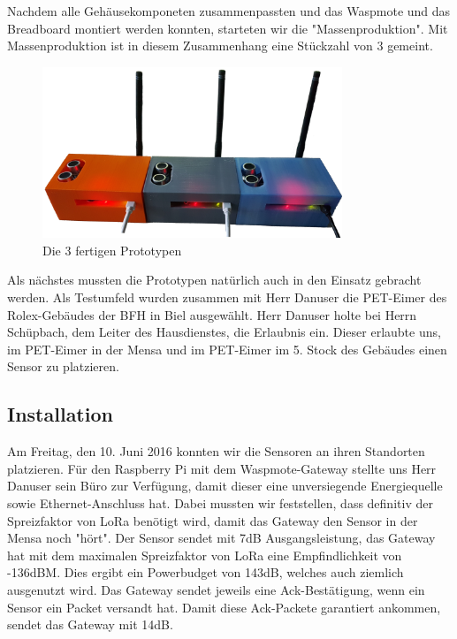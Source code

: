 Nachdem alle Gehäusekomponeten zusammenpassten und das Waspmote und das Breadboard montiert werden konnten, starteten wir die "Massenproduktion". Mit Massenproduktion ist in diesem Zusammenhang eine Stückzahl von 3 gemeint.

\begin{figure}[H]
     \centering
        \includegraphics[width=0.8\textwidth]{pictures/Massproduction.jpg}
    \caption{Die 3 fertigen Prototypen}
    \label{fig:3-Prototypes}
\end{figure}

Als nächstes mussten die Prototypen natürlich auch in den Einsatz gebracht werden. Als Testumfeld wurden zusammen mit Herr Danuser die PET-Eimer des Rolex-Gebäudes der BFH in Biel ausgewählt. Herr Danuser holte bei Herrn Schüpbach, dem Leiter des Hausdienstes, die Erlaubnis ein. Dieser erlaubte uns, im PET-Eimer in der Mensa und im PET-Eimer im 5. Stock des Gebäudes einen Sensor zu platzieren.

\subsection*{Installation}
Am Freitag, den 10. Juni 2016 konnten wir die Sensoren an ihren Standorten platzieren. Für den Raspberry Pi mit dem Waspmote-Gateway stellte uns Herr Danuser sein Büro zur Verfügung, damit dieser eine unversiegende Energiequelle sowie Ethernet-Anschluss hat.
Dabei mussten wir feststellen, dass definitiv der Spreizfaktor von LoRa benötigt wird, damit das Gateway den Sensor in der Mensa noch "hört". Der Sensor sendet mit 7dB Ausgangsleistung, das Gateway hat mit dem maximalen Spreizfaktor von LoRa eine Empfindlichkeit von -136dBM. Dies ergibt ein Powerbudget von 143dB, welches auch ziemlich ausgenutzt wird. Das Gateway sendet jeweils eine Ack-Bestätigung, wenn ein Sensor ein Packet versandt hat. Damit diese Ack-Packete garantiert ankommen, sendet das Gateway mit 14dB.

